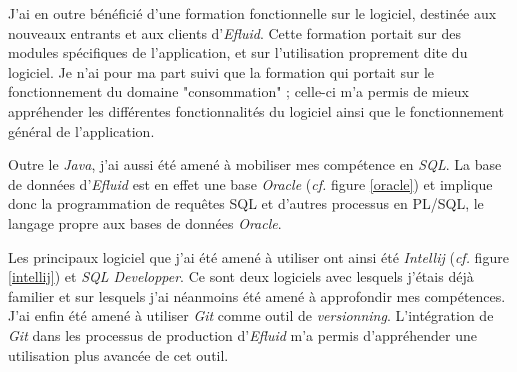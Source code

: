\documentclass[a4paper, 12pt]{report}
\begin{document}
J'ai en outre bénéficié d'une formation fonctionnelle sur le logiciel, destinée aux nouveaux entrants et aux clients d'\textit{Efluid}. Cette formation portait sur des modules spécifiques de l'application, et sur l'utilisation proprement dite du logiciel. Je n'ai pour ma part suivi que la formation qui portait sur le fonctionnement du domaine "consommation" ; celle-ci m'a permis de mieux appréhender les différentes fonctionnalités du logiciel ainsi que le fonctionnement général de l'application.

Outre le \textit{Java}, j'ai aussi été amené à mobiliser mes compétence en \textit{SQL}. La base de données d'\textit{Efluid} est en effet une base \textit{Oracle} (\textit{cf.} figure \ref{oracle}) et implique donc la programmation de requêtes SQL et d'autres processus en PL/SQL, le langage propre aux bases de données \textit{Oracle}.

Les principaux logiciel que j'ai été amené à utiliser ont ainsi été \textit{Intellij} (\textit{cf.} figure \ref{intellij}) et \textit{SQL Developper}. Ce sont deux logiciels avec lesquels j'étais déjà familier et sur lesquels j'ai néanmoins été amené à approfondir mes compétences. J'ai enfin été amené à utiliser \textit{Git} comme outil de \textit{versionning}. L'intégration de \textit{Git} dans les processus de production d'\textit{Efluid} m'a permis d'appréhender une utilisation plus avancée de cet outil.
\end{document}

